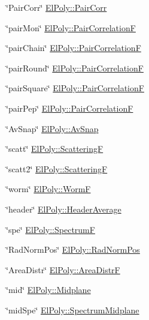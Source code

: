 \begin{DoxyItemize}
\item \char`\"{}\-Pair\-Corr\char`\"{} \hyperlink{classElPoly_a56b4b9780b4f84eb1713ca48b49fbbb2}{\-El\-Poly\-::\-Pair\-Corr} 
\item \char`\"{}pair\-Mon\char`\"{} \hyperlink{classElPoly_a7a3305d9ff38757faf367ced9abf89f0}{\-El\-Poly\-::\-Pair\-Correlation\-F} 
\item \char`\"{}pair\-Chain\char`\"{} \hyperlink{classElPoly_a7a3305d9ff38757faf367ced9abf89f0}{\-El\-Poly\-::\-Pair\-Correlation\-F} 
\item \char`\"{}pair\-Round\char`\"{} \hyperlink{classElPoly_a7a3305d9ff38757faf367ced9abf89f0}{\-El\-Poly\-::\-Pair\-Correlation\-F} 
\item \char`\"{}pair\-Square\char`\"{} \hyperlink{classElPoly_a7a3305d9ff38757faf367ced9abf89f0}{\-El\-Poly\-::\-Pair\-Correlation\-F} 
\item \char`\"{}pair\-Pep\char`\"{} \hyperlink{classElPoly_a7a3305d9ff38757faf367ced9abf89f0}{\-El\-Poly\-::\-Pair\-Correlation\-F} 
\item \char`\"{}\-Av\-Snap\char`\"{} \hyperlink{classElPoly_aafe33ef0f28995ba7c1a778196decf9b}{\-El\-Poly\-::\-Av\-Snap} 
\item \char`\"{}scatt\char`\"{} \hyperlink{classElPoly_a1aa4889418bf8c589875e1c77b5262d2}{\-El\-Poly\-::\-Scattering\-F} 
\item \char`\"{}scatt2\char`\"{} \hyperlink{classElPoly_a1aa4889418bf8c589875e1c77b5262d2}{\-El\-Poly\-::\-Scattering\-F} 
\item \char`\"{}worm\char`\"{} \hyperlink{classElPoly_ad6fa03abf69921d9a0759689569e35e9}{\-El\-Poly\-::\-Worm\-F} 
\item \char`\"{}header\char`\"{} \hyperlink{classElPoly_a2eab2da94941b822d51d4e21bfe64aef}{\-El\-Poly\-::\-Header\-Average} 
\item \char`\"{}spe\char`\"{} \hyperlink{classElPoly_ada953db0b772595339ef925b5dbd8c62}{\-El\-Poly\-::\-Spectrum\-F} 
\item \char`\"{}\-Rad\-Norm\-Pos\char`\"{} \hyperlink{classElPoly_ad3a244bc00c2c8216b1f5cbd36699cdc}{\-El\-Poly\-::\-Rad\-Norm\-Pos} 
\item \char`\"{}\-Area\-Distr\char`\"{} \hyperlink{classElPoly_a16d58960eae98f1ad67971068f12a22c}{\-El\-Poly\-::\-Area\-Distr\-F} 
\item \char`\"{}mid\char`\"{} \hyperlink{classElPoly_a16156b6e530ecc6df93b6ffd3c229f1b}{\-El\-Poly\-::\-Midplane} 
\item \char`\"{}mid\-Spe\char`\"{} \hyperlink{classElPoly_a669491e5e5c66f665694c9d8908d3109}{\-El\-Poly\-::\-Spectrum\-Midplane} 

\end{DoxyItemize}
